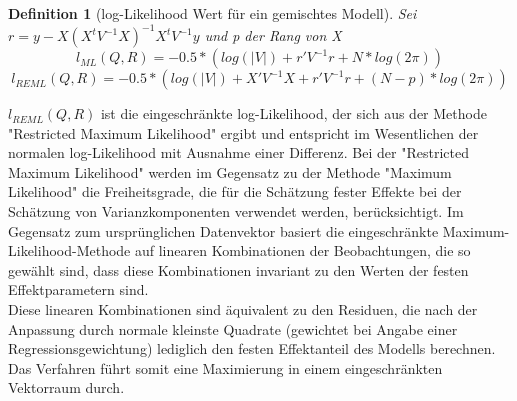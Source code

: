 \documentclass[%
thesis=student,%
coverpage=false,%
titlepage=false,%
headmarks=true, %
german,%
font=libertine, %
math=newpxtx, %
BCOR=5mm,%
coverBCOR=11mm%
]{tumbook}
\theoremstyle{break}
\newtheorem{definition}{Definition}[section]
\begin{document}
\begin{definition}[log-Likelihood Wert für ein gemischtes Modell]
	Sei $r = y - X(X^tV^{-1}X)^{-1}X^tV^{-1}y$ und p der Rang von X
	$$ l_{ML}(Q,R) = -0.5 * (log(|V|)+ r'V^{-1}r + N * log(2\pi))$$
	$$l_{REML}(Q,R) = -0.5 * (log(|V|)+ X'V^{-1}X + r'V^{-1}r+ (N-p) * log(2\pi))$$
\end{definition}\noindent
$l_{REML}(Q,R)$ ist die eingeschränkte log-Likelihood, der sich aus der Methode "Restricted Maximum Likelihood" ergibt und entspricht im Wesentlichen der normalen log-Likelihood mit Ausnahme einer Differenz. Bei der "Restricted Maximum Likelihood" werden im Gegensatz zu der Methode "Maximum Likelihood" die Freiheitsgrade, die für die Schätzung fester Effekte bei der Schätzung von Varianzkomponenten verwendet werden, berücksichtigt. Im Gegensatz zum ursprünglichen Datenvektor basiert die eingeschränkte Maximum-Likelihood-Methode auf linearen Kombinationen der Beobachtungen, die so gewählt sind, dass diese Kombinationen invariant zu den Werten der festen Effektparametern sind. \\
Diese linearen Kombinationen sind äquivalent zu den Residuen, die nach der Anpassung durch normale kleinste Quadrate (gewichtet bei Angabe einer Regressionsgewichtung) lediglich den festen Effektanteil des Modells berechnen. Das Verfahren führt somit eine Maximierung in einem eingeschränkten Vektorraum durch.
\end{document}
